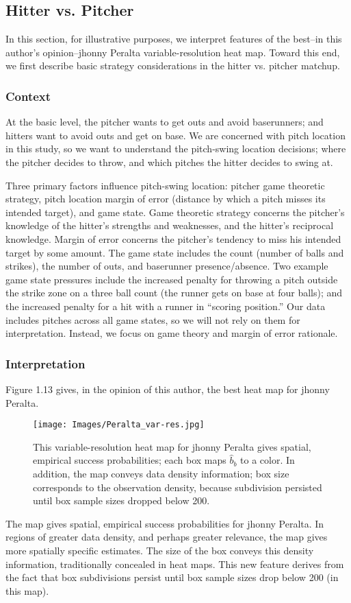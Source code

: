 \subsection{Hitter vs. Pitcher} %
In this section, for illustrative purposes, we interpret features of the best--in this author's opinion--jhonny Peralta variable-resolution heat map. Toward this end, we first describe basic strategy considerations in the hitter vs. pitcher matchup. 

\subsubsection*{Context}
At the basic level, the pitcher wants to get outs and avoid baserunners; and hitters want to avoid outs and get on base. We are concerned with pitch location in this study, so we want to understand the pitch-swing location decisions; where the pitcher decides to throw, and which pitches the hitter decides to swing at. 

Three primary factors influence pitch-swing location: pitcher game theoretic strategy, pitch location margin of error (distance by which a pitch misses its intended target), and game state. Game theoretic strategy concerns the pitcher's knowledge of the hitter's strengths and weaknesses, and the hitter's reciprocal knowledge. Margin of error concerns the pitcher's tendency to miss his intended target by some amount. The game state includes the count (number of balls and strikes), the number of outs, and baserunner presence/absence. Two example game state pressures include the increased penalty for throwing a pitch outside the strike zone on a three ball count (the runner gets on base at four balls); and the increased penalty for a hit with a runner in ``scoring position.'' Our data includes pitches across all game states, so we will not rely on them for interpretation. Instead, we focus on game theory and margin of error rationale. 

\subsubsection*{Interpretation}
Figure 1.13 gives, in the opinion of this author, the best heat map for jhonny Peralta.
        \begin{figure}[H]
      	\centering      
      	\texttt{[image: Images/Peralta\_var-res.jpg]}
      	\caption{This variable-resolution heat map for jhonny Peralta gives spatial, empirical success probabilities; each box maps $\hat{b}_{b}$ to a color. In addition, the map conveys data density information; box size corresponds to the observation density, because subdivision persisted until box sample sizes dropped below 200.}
\end{figure}
The map gives spatial, empirical success probabilities for jhonny Peralta. In regions of greater data density, and perhaps greater relevance, the map gives more spatially specific estimates. The size of the box conveys this density information, traditionally concealed in heat maps. This new feature derives from the fact that box subdivisions persist until box sample sizes drop below 200 (in this map).


